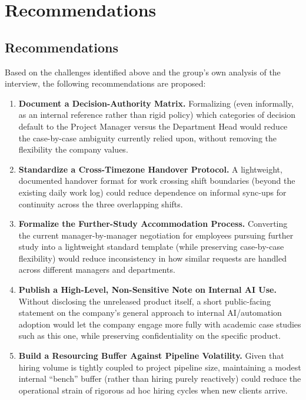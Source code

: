 \documentclass[12pt,a4paper]{report}
\begin{document}
\chapter{Recommendations}

\section{Recommendations}

Based on the challenges identified above and the group's own analysis of the interview, the following recommendations are proposed:

\begin{enumerate}[leftmargin=1.5cm]
  \item \textbf{Document a Decision-Authority Matrix.} Formalizing (even informally, as an internal reference rather than rigid policy) which categories of decision default to the Project Manager versus the Department Head would reduce the case-by-case ambiguity currently relied upon, without removing the flexibility the company values.
  \item \textbf{Standardize a Cross-Timezone Handover Protocol.} A lightweight, documented handover format for work crossing shift boundaries (beyond the existing daily work log) could reduce dependence on informal sync-ups for continuity across the three overlapping shifts.
  \item \textbf{Formalize the Further-Study Accommodation Process.} Converting the current manager-by-manager negotiation for employees pursuing further study into a lightweight standard template (while preserving case-by-case flexibility) would reduce inconsistency in how similar requests are handled across different managers and departments.
  \item \textbf{Publish a High-Level, Non-Sensitive Note on Internal AI Use.} Without disclosing the unreleased product itself, a short public-facing statement on the company's general approach to internal AI/automation adoption would let the company engage more fully with academic case studies such as this one, while preserving confidentiality on the specific product.
  \item \textbf{Build a Resourcing Buffer Against Pipeline Volatility.} Given that hiring volume is tightly coupled to project pipeline size, maintaining a modest internal ``bench'' buffer (rather than hiring purely reactively) could reduce the operational strain of rigorous ad hoc hiring cycles when new clients arrive.
\end{enumerate}
\end{document}
